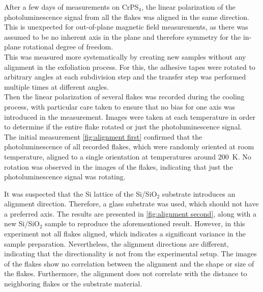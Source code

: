 \documentclass[
	oneside,
	parskip=half,
	a4paper,
]{scrbook}
\begin{document}
After a few days of measurements on CrPS$_4$, the linear polarization of the photoluminescence signal from all the flakes was aligned in the same direction.
This is unexpected for out-of-plane magnetic field measurements, as there was assumed to be no inherent axis in the plane and therefore symmetry for the in-plane rotational degree of freedom.\\
This was measured more systematically by creating new samples without any alignment in the exfoliation process.
For this, the adhesive tapes were rotated to arbitrary angles at each subdivision step and the transfer step was performed multiple times at different angles.\\
Then the linear polarization of several flakes was recorded during the cooling process, with particular care taken to ensure that no bias for one axis was introduced in the measurement.
Images were taken at each temperature in order to determine if the entire flake rotated or just the photoluminescence signal. \\
The initial measurement \autoref{fig:alignment first} confirmed that the photoluminescence of all recorded flakes, which were randomly oriented at room temperature, aligned to a single orientation at temperatures around \SI{200}{K}.
No rotation was observed in the images of the flakes, indicating that just the photoluminescence signal was rotating.

It was suspected that the Si lattice of the Si/SiO$_2$ substrate introduces an alignment direction.
Therefore, a glass substrate was used, which should not have a preferred axis.  
The results are presented in \autoref{fig:alignment second}, along with a new Si/SiO$_2$ sample to reproduce the aforementioned result.
However, in this experiment not all flakes aligned, which indicates a significant variance in the sample preparation.
Nevertheless, the alignment directions are different, indicating that the directionality is not from the experimental setup.
The images of the flakes show no correlation between the alignment and the shape or size of the flakes. 
Furthermore, the alignment does not correlate with the distance to neighboring flakes or the substrate material.
\end{document}
